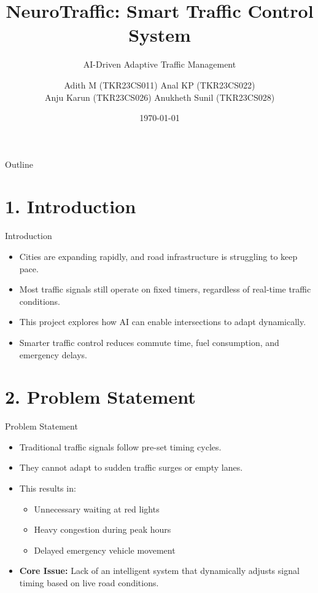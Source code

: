 \documentclass[aspectratio=169]{beamer}
\title[NeuroTraffic]{NeuroTraffic: Smart Traffic Control System}
\subtitle{AI-Driven Adaptive Traffic Management}
\author{
  {\small 
    Adith M (TKR23CS011) \quad Anal KP (TKR23CS022) \\ 
    Anju Karun (TKR23CS026) \quad Anukheth Sunil (TKR23CS028)
  }
}
\institute{College of Engineering Trikaripur}
\date{\today}
\begin{document}
\begin{frame}[shrink]
  \titlepage
\end{frame}

\begin{frame}[allowframebreaks]{Outline}
  \tableofcontents
\end{frame}

\section{1. Introduction}

\begin{frame}{Introduction}
\begin{itemize}
    \item Cities are expanding rapidly, and road infrastructure is struggling to keep pace.
    \item Most traffic signals still operate on fixed timers, regardless of real-time traffic conditions.
    \item This project explores how AI can enable intersections to adapt dynamically.
    \item Smarter traffic control reduces commute time, fuel consumption, and emergency delays.
\end{itemize}
\end{frame}

\section{2. Problem Statement}

\begin{frame}{Problem Statement}
\begin{itemize}
    \item Traditional traffic signals follow pre-set timing cycles.
    \item They cannot adapt to sudden traffic surges or empty lanes.
    \item This results in:
    \begin{itemize}
        \item Unnecessary waiting at red lights
        \item Heavy congestion during peak hours
        \item Delayed emergency vehicle movement
    \end{itemize}
    \item \textbf{Core Issue:} Lack of an intelligent system that dynamically adjusts signal timing based on live road conditions.
\end{itemize}
\end{frame}
\end{document}
